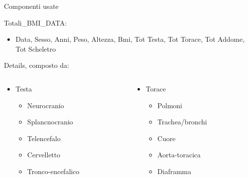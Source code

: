 \documentclass{beamer}
\begin{document}
\begin{frame}{Componenti usate}
	\begin{block}{}
	Totali\_BMI\_DATA:
		\begin{itemize}
		\item Data, Sesso, Anni, Peso, Altezza, Bmi, Tot Testa, Tot Torace, Tot Addome, Tot Scheletro
		\end{itemize}
	\end{block}
	\begin{block}{}
		Details, composto da:
		\begin{columns}[t]
			\begin{column}{0.5\textwidth}
				\begin{itemize}
					\item Testa
					\begin{itemize}
						\item Neurocranio
						\item Splancnocranio
						\item Telencefalo
						\item Cervelletto
						\item Tronco-encefalico
					\end{itemize}
				\end{itemize}
			\end{column}
			\begin{column}{0.5\textwidth}
				\begin{itemize}
					\item Torace
					\begin{itemize}
						\item Polmoni
						\item Trachea/bronchi
						\item Cuore
						\item Aorta-toracica
						\item Diaframma
					\end{itemize}
				\end{itemize}
			\end{column}
		\end{columns}
	\end{block}
\end{frame}
\end{document}
